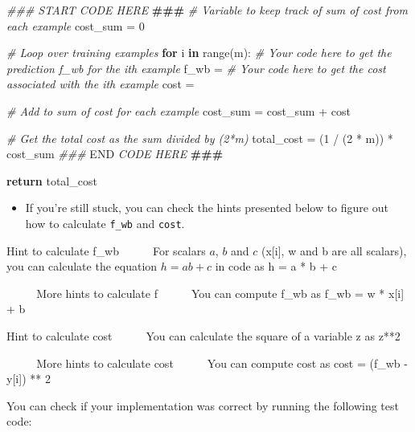 \documentclass[11pt]{article}
\providecommand{\tightlist}{%
      \setlength{\itemsep}{0pt}\setlength{\parskip}{0pt}}
\newenvironment{Shaded}{}{}
\newcommand{\KeywordTok}[1]{\textcolor[rgb]{0.00,0.44,0.13}{\textbf{{#1}}}}
\newcommand{\DecValTok}[1]{\textcolor[rgb]{0.25,0.63,0.44}{{#1}}}
\newcommand{\CommentTok}[1]{\textcolor[rgb]{0.38,0.63,0.69}{\textit{{#1}}}}
\newcommand{\AlertTok}[1]{\textcolor[rgb]{1.00,0.00,0.00}{\textbf{{#1}}}}
\newcommand{\RegionMarkerTok}[1]{{#1}}
\newcommand{\NormalTok}[1]{{#1}}
\newcommand{\ControlFlowTok}[1]{\textcolor[rgb]{0.00,0.44,0.13}{\textbf{{#1}}}}
\newcommand{\OperatorTok}[1]{\textcolor[rgb]{0.40,0.40,0.40}{{#1}}}
\newcommand{\BuiltInTok}[1]{{#1}}
\begin{document}
\begin{itemize}
\begin{Shaded}
\begin{Highlighting}[]
     \CommentTok{\#\#\# START CODE HERE }\AlertTok{\#\#\#}\CommentTok{  }
     \CommentTok{\# Variable to keep track of sum of cost from each example}
\NormalTok{     cost\_sum }\OperatorTok{=} \DecValTok{0}

     \CommentTok{\# Loop over training examples}
     \ControlFlowTok{for}\NormalTok{ i }\KeywordTok{in} \BuiltInTok{range}\NormalTok{(m):}
         \CommentTok{\# Your code here to get the prediction f\_wb for the ith example}
\NormalTok{         f\_wb }\OperatorTok{=} 
         \CommentTok{\# Your code here to get the cost associated with the ith example}
\NormalTok{         cost }\OperatorTok{=} 

         \CommentTok{\# Add to sum of cost for each example}
\NormalTok{         cost\_sum }\OperatorTok{=}\NormalTok{ cost\_sum }\OperatorTok{+}\NormalTok{ cost }

     \CommentTok{\# Get the total cost as the sum divided by (2*m)}
\NormalTok{     total\_cost }\OperatorTok{=}\NormalTok{ (}\DecValTok{1} \OperatorTok{/}\NormalTok{ (}\DecValTok{2} \OperatorTok{*}\NormalTok{ m)) }\OperatorTok{*}\NormalTok{ cost\_sum}
     \CommentTok{\#\#\# }\RegionMarkerTok{END}\CommentTok{ CODE HERE }\AlertTok{\#\#\#}\CommentTok{ }

     \ControlFlowTok{return}\NormalTok{ total\_cost}
\end{Highlighting}
\end{Shaded}

  \begin{itemize}
  \tightlist
  \item
    If you're still stuck, you can check the hints presented below to
    figure out how to calculate \texttt{f\_wb} and \texttt{cost}.
  \end{itemize}

  Hint to calculate f\_wb     For scalars \(a\), \(b\) and \(c\)
  (x{[}i{]}, w and b are all scalars), you can calculate the equation
  \(h = ab + c\) in code as h = a * b + c

      More hints to calculate f     You can compute f\_wb as f\_wb = w *
  x{[}i{]} + b

  Hint to calculate cost     You can calculate the square of a variable
  z as z**2

      More hints to calculate cost     You can compute cost as cost =
  (f\_wb - y{[}i{]}) ** 2
\end{itemize}

    You can check if your implementation was correct by running the
following test code:
\end{document}
